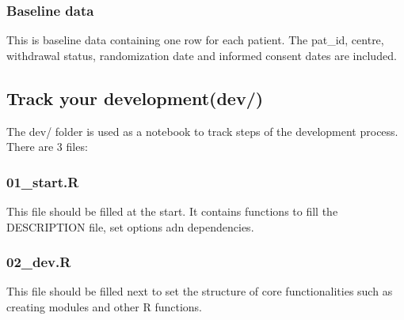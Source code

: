 \documentclass[]{article}
\newenvironment{Shaded}{\begin{snugshade}}{\end{snugshade}}
\newcommand{\CommentTok}[1]{\textcolor[rgb]{0.56,0.35,0.01}{\textit{#1}}}
\newcommand{\KeywordTok}[1]{\textcolor[rgb]{0.13,0.29,0.53}{\textbf{#1}}}
\newcommand{\NormalTok}[1]{#1}
\begin{document}
\hypertarget{baseline-data}{%
\subsubsection{Baseline data}\label{baseline-data}}

This is baseline data containing one row for each patient. The pat\_id,
centre, withdrawal status, randomization date and informed consent dates
are included.

\begin{Shaded}
\end{Shaded}

\hypertarget{track-your-developmentdev}{%
\subsection{\texorpdfstring{\textbf{Track your
development}(dev/)}{Track your development(dev/)}}\label{track-your-developmentdev}}

The dev/ folder is used as a notebook to track steps of the development
process. There are 3 files:

\hypertarget{start.r}{%
\subsubsection{01\_start.R}\label{start.r}}

This file should be filled at the start. It contains functions to fill
the DESCRIPTION file, set options adn dependencies.

\hypertarget{dev.r}{%
\subsubsection{02\_dev.R}\label{dev.r}}

This file should be filled next to set the structure of core
functionalities such as creating modules and other R functions.
\end{document}
